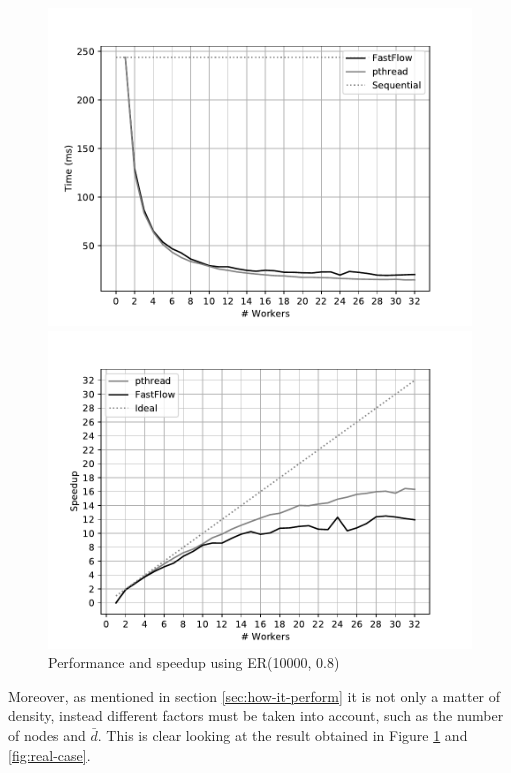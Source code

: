\begin{figure}[!htb]
\begin{minipage}{0.48\textwidth}
        \includegraphics[width=\textwidth]{plots/fastflow_performance_08_time.pdf}
    \end{minipage}
    \begin{minipage}{0.48\textwidth}
        \includegraphics[width=\textwidth]{plots/fastflow_speedup_08_time.pdf}
    \end{minipage}
    \caption{Performance and speedup using ER(10000, 0.8)}
    \label{fig:perf_08}
\end{figure}

Moreover, as mentioned in section \ref{sec:how-it-perform} it is not only a matter of density, instead different factors must be taken into account, such as the number of nodes and $\bar{d}$. This is clear looking at the result obtained in Figure \ref{fig:perf_08} and \ref{fig:real-case}.

